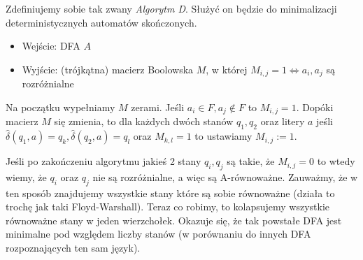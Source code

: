 Zdefiniujemy sobie tak zwany \textit{Algorytm D}. Służyć on będzie do minimalizacji deterministycznych automatów skończonych.

\begin{itemize}
    \item Wejście: DFA \( A \)
    \item Wyjście: (trójkątna) macierz Boolowska \( M \), w której \( M_{i, j} = 1 \iff a_i, a_j \) są rozróżnialne
\end{itemize}

Na początku wypełniamy \( M \) zerami.
Jeśli \( a_i \in F, a_j \notin F \) to \( M_{i, j} = 1 \).
Dopóki macierz \( M \) się zmienia, to dla każdych dwóch stanów \( q_1, q_2 \) oraz litery \( a \) jeśli \( \hat \delta(q_1, a) = q_k, \hat \delta(q_2, a) = q_l \) oraz \( M_{k, l} = 1 \) to ustawiamy \( M_{i, j} := 1 \).

Jeśli po zakończeniu algorytmu jakieś 2 stany \(q_i, q_j\) są takie, że \(M_{i,j} = 0\) to wtedy wiemy, że \(q_i\) oraz \(q_j\) nie są rozróżnialne, a więc są A-równoważne. Zauważmy, że w ten sposób znajdujemy wszystkie stany które są sobie równoważne (działa to trochę jak taki Floyd-Warshall). Teraz co robimy, to kolapsujemy wszystkie równoważne stany w jeden wierzchołek. Okazuje się, że tak powstałe DFA jest minimalne pod względem liczby stanów (w porównaniu do innych DFA rozpoznających ten sam język). 

